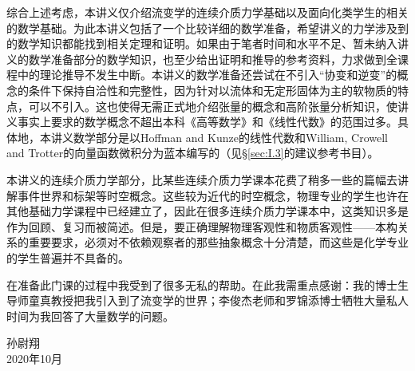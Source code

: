 \documentclass[main.tex]{subfiles}
\begin{document}
综合上述考虑，本讲义仅介绍流变学的连续介质力学基础以及面向化类学生的相关的数学基础。为此本讲义包括了一个比较详细的数学准备，希望讲义的力学涉及到的数学知识都能找到相关定理和证明。如果由于笔者时间和水平不足、暂未纳入讲义的数学准备部分的数学知识，也至少给出证明和推导的参考资料，力求做到全课程中的理论推导不发生中断。本讲义的数学准备还尝试在不引入“协变和逆变”的概念的条件下保持自洽性和完整性，因为针对以流体和无定形固体为主的软物质的特点，可以不引入。这也使得无需正式地介绍张量的概念和高阶张量分析知识，使讲义事实上要求的数学概念不超出本科《高等数学》和《线性代数》的范围过多。具体地，本讲义数学部分是以Hoffman and Kunze的线性代数和William, Crowell and Trotter的向量函数微积分为蓝本编写的（见\S \ref{sec:I.3}的建议参考书目）。

本讲义的连续介质力学部分，比某些连续介质力学课本花费了稍多一些的篇幅去讲解事件世界和标架等时空概念。这些较为近代的时空概念，物理专业的学生也许在其他基础力学课程中已经建立了，因此在很多连续介质力学课本中，这类知识多是作为回顾、复习而被简述。但是，要正确理解物理客观性和物质客观性——本构关系的重要要求，必须对不依赖观察者的那些抽象概念十分清楚，而这些是化学专业的学生普遍并不具备的。

在准备此门课的过程中我受到了很多无私的帮助。在此我需重点感谢：我的博士生导师童真教授把我引入到了流变学的世界；李俊杰老师和罗锦添博士牺牲大量私人时间为我回答了大量数学的问题。

\begin{flushright}
孙尉翔\\
2020年10月
\end{flushright}
\end{document}
